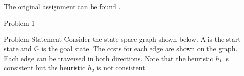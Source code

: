 \clearpage

\chapter{\documentName}
\section{\documentName}

\testimonial

The original assignment can be found .

\begin{problem}{Problem 1}
    \begin{statement}{Problem Statement}
        Consider the state space graph shown below. A is the start state and G is the goal state. The costs for each edge are shown on the graph. Each edge can be traversed in both directions. Note that the heuristic $h_{1}$ is consistent but the heuristic $h_{2}$ is not consistent.


\end{statement}
\end{problem}
